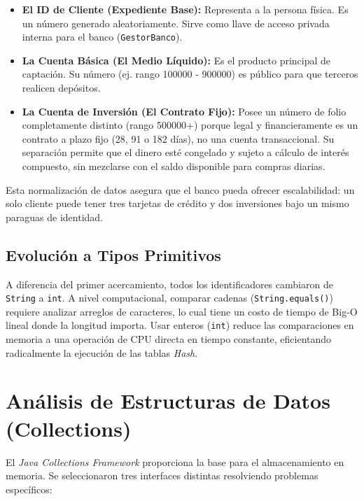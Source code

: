\documentclass[12pt, letterpaper]{article}
\begin{document}
	\begin{itemize}
		\item \textbf{El ID de Cliente (Expediente Base):} Representa a la persona física. Es un número generado aleatoriamente. Sirve como llave de acceso privada interna para el banco (\texttt{GestorBanco}).
		\item \textbf{La Cuenta Básica (El Medio Líquido):} Es el producto principal de captación. Su número (ej. rango 100000 - 900000) es público para que terceros realicen depósitos.
		\item \textbf{La Cuenta de Inversión (El Contrato Fijo):} Posee un número de folio completamente distinto (rango 500000+) porque legal y financieramente es un contrato a plazo fijo (28, 91 o 182 días), no una cuenta transaccional. Su separación permite que el dinero esté congelado y sujeto a cálculo de interés compuesto, sin mezclarse con el saldo disponible para compras diarias.
	\end{itemize}
	Esta normalización de datos asegura que el banco pueda ofrecer escalabilidad: un solo cliente puede tener tres tarjetas de crédito y dos inversiones bajo un mismo paraguas de identidad.
	
	\subsection{Evolución a Tipos Primitivos}
	A diferencia del primer acercamiento, todos los identificadores cambiaron de \texttt{String} a \texttt{int}. A nivel computacional, comparar cadenas (\texttt{String.equals()}) requiere analizar arreglos de caracteres, lo cual tiene un costo de tiempo de Big-O lineal donde la longitud importa. Usar enteros (\texttt{int}) reduce las comparaciones en memoria a una operación de CPU directa en tiempo constante, eficientando radicalmente la ejecución de las tablas \textit{Hash}.
	
	\section{Análisis de Estructuras de Datos (Collections)}
	El \textit{Java Collections Framework} proporciona la base para el almacenamiento en memoria. Se seleccionaron tres interfaces distintas resolviendo problemas específicos:
	
\end{document}
